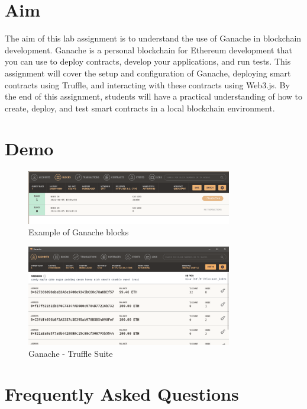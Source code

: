\documentclass[11pt]{article}
\begin{document}
\tableofcontents
\thispagestyle{empty}
\clearpage

\setcounter{page}{1}

\section{Aim}
The aim of this lab assignment is to understand the use of Ganache in blockchain development. Ganache is a personal blockchain for Ethereum development that you can use to deploy contracts, develop your applications, and run tests. This assignment will cover the setup and configuration of Ganache, deploying smart contracts using Truffle, and interacting with these contracts using Web3.js. By the end of this assignment, students will have a practical understanding of how to create, deploy, and test smart contracts in a local blockchain environment.
\section{Demo}

\begin{figure}[H]
    \centering
    \includegraphics[width=0.8\textwidth]{ganache_block_mined.png}
    \caption{Example of Ganache blocks}
    \label{fig:1}
\end{figure}

\begin{figure}[H]
    \centering
    \includegraphics[width=0.8\textwidth]{ganache-window.png}
    \caption{Ganache - Truffle Suite}
    \label{fig:1}
\end{figure}
\section{Frequently Asked Questions}
\end{document}
